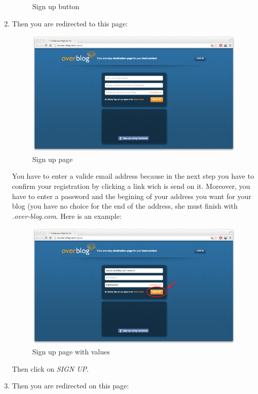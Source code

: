 \documentclass[a4paper,10pt]{article}
\begin{document}
\begin{enumerate}
\begin{figure}[H]
    \caption{Sign up button}
\end{figure}
\item Then you are redirected to this page:
\begin{figure}[H]
    \center
	\includegraphics[width=13cm]{Images/signUpPage.png}
    \caption{Sign up page}
\end{figure}
You have to enter a valide email address because in the next step you have to confirm your registration by clicking a link wich is send on it. Moreover, you have to enter a password and the begining of your address you want for your blog (you have no choice for the end of the address, she must finish with \emph{.over-blog.com}. Here is an example:
\begin{figure}[H]
    \center
	\includegraphics[width=13cm]{Images/signUpPageValues.png}
    \caption{Sign up page with values}
\end{figure}
Then click on \emph{SIGN UP}.
\item Then you are redirected on this page:
\begin{figure}[H]
    \center

\end{figure}
\end{enumerate}
\end{document}
